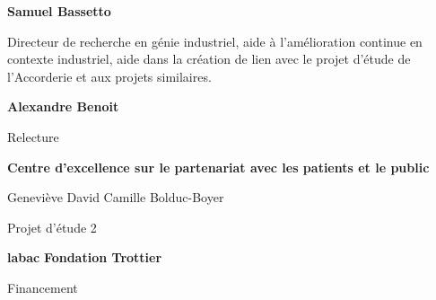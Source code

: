 %

%

\textbf{Samuel Bassetto}

Directeur de recherche en génie industriel, aide à l’amélioration continue en contexte industriel, aide dans la création de lien avec le projet d’étude de l’Accorderie et aux projets similaires.

\textbf{Alexandre Benoit}

Relecture



\textbf{Centre d'excellence sur le partenariat avec les patients et le public}

Geneviève David
Camille Bolduc-Boyer

Projet d’étude 2

\textbf{labac}
\textbf{Fondation Trottier}

Financement

